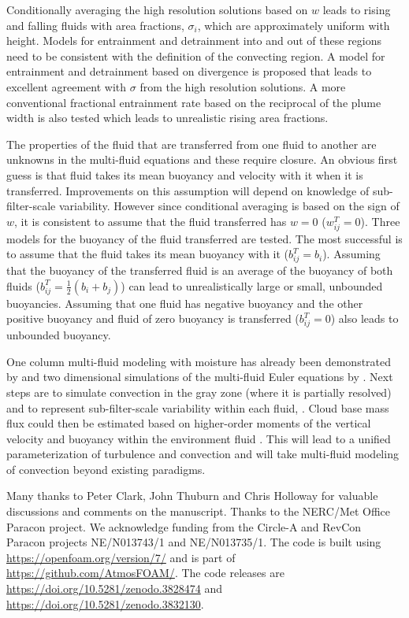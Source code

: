 \documentclass[draft]{agujournal2019}
\begin{document}
Conditionally averaging the high resolution solutions based on $w$
leads to
rising and falling fluids with area fractions, $\sigma_{i}$, which are approximately uniform with height. Models for entrainment and detrainment into and out of these regions
need to be consistent with the definition of the convecting region.
A model for entrainment and detrainment based on divergence is proposed
that leads to excellent agreement with $\sigma$ from the high resolution
solutions. A more conventional fractional entrainment rate based on the reciprocal of the plume width is also tested which leads to unrealistic rising area fractions. 

The properties of the fluid that are transferred from one fluid to another are unknowns in the multi-fluid equations and these require closure. An obvious
first guess is that fluid takes its mean buoyancy and velocity
with it when it is transferred.
Improvements on this assumption will depend on knowledge of sub-filter-scale variability. However since conditional averaging is based on the sign of $w$, it is consistent to assume that the fluid transferred has $w=0$ ($w_{ij}^T=0$).
Three models for the buoyancy of the fluid transferred 
are tested. The most successful
is to assume that the fluid takes its mean buoyancy with it
($b_{ij}^T=b_i$).
Assuming that the buoyancy of the transferred fluid is an average of the buoyancy of both fluids ($b_{ij}^T=\frac{1}{2}(b_i+b_j)$) can lead to unrealistically large or small, unbounded buoyancies. 
Assuming that one fluid has negative buoyancy and the other positive buoyancy and fluid of zero buoyancy is transferred ($b_{ij}^T=0$) also leads to unbounded buoyancy. 

One column multi-fluid modeling with moisture has already been demonstrated by  and two dimensional simulations of the multi-fluid Euler equations by \protect{}.
Next steps are to simulate convection in the gray zone (where it is partially resolved) and to represent sub-filter-scale variability within each fluid, .
Cloud base mass flux could then be estimated based on higher-order moments of the vertical velocity and buoyancy within the environment fluid .
This will lead to a unified parameterization of turbulence and convection and will take multi-fluid modeling of convection beyond existing paradigms. 

\acknowledgments

Many thanks to Peter Clark, John Thuburn and Chris Holloway for valuable discussions and comments on the manuscript.
Thanks to the NERC/Met Office Paracon project. We acknowledge funding
from the Circle-A and RevCon Paracon projects NE/N013743/1 and NE/N013735/1. The code is built using \url{https://openfoam.org/version/7/} and is part of \url{https://github.com/AtmosFOAM/}. The code releases are \url{https://doi.org/10.5281/zenodo.3828474} and \url{https://doi.org/10.5281/zenodo.3832130}.


\end{document}
